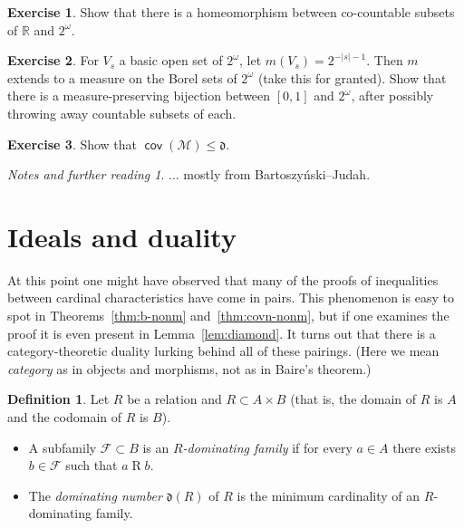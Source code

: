 \documentclass[11pt,oneside]{amsbook}
\newcommand{\R}{\mathbb R}
\newcommand{\Meager}{\mathcal M}
\DeclareMathOperator{\cov}{\mathsf{cov}}
\theoremstyle{definition}
\newtheorem{exercise}{Exercise}[section]
\theoremstyle{plain}
\theoremstyle{definition}
\newtheorem{definition}[theorem]{Definition}
\theoremstyle{remark}
\newtheorem*{notes}{Notes and further reading}
\numberwithin{equation}{section}
\numberwithin{figure}{section}
\begin{document}
\begin{exercise}
  \label{exerc:meager-bij}
  Show that there is a homeomorphism between co-countable subsets of $\R$ and $2^\omega$.
\end{exercise}

\begin{exercise}
  \label{exerc:null-bij}
  For $V_s$ a basic open set of $2^\omega$, let $m(V_s)=2^{-|s|-1}$. Then $m$ extends to a measure on the Borel sets of $2^\omega$ (take this for granted). Show that there is a measure-preserving bijection between $[0,1]$ and $2^\omega$, after possibly throwing away countable subsets of each.
\end{exercise}

\begin{exercise}
  \label{exerc:covm-d}
  Show that $\cov(\Meager)\leq\mathfrak d$.
\end{exercise}

\begin{notes}
  ... mostly from Bartoszy\'nski--Judah.
\end{notes}


\newpage
\section{Ideals and duality}

At this point one might have observed that many of the proofs of inequalities between cardinal characteristics have come in pairs. This phenomenon is easy to spot in Theorems~\ref{thm:b-nonm} and~\ref{thm:covn-nonm}, but if one examines the proof it is even present in Lemma~\ref{lem:diamond}. It turns out that there is a category-theoretic duality lurking behind all of these pairings. (Here we mean \emph{category} as in objects and morphisms, not as in Baire's theorem.)

\begin{definition}
  Let $R$ be a relation and $R\subset A\times B$ (that is, the domain of $R$ is $A$ and the codomain of $R$ is $B$).
  \begin{itemize}
  \item A subfamily $\mathcal F\subset B$ is an \emph{$R$-dominating family} if for every $a\in A$ there exists $b\in\mathcal F$ such that $a\mathrel{R}b$.
  \item The \emph{dominating number} $\mathfrak d(R)$ of $R$ is the minimum cardinality of an $R$-dominating family.
  \end{itemize}
\end{definition}
\end{document}
